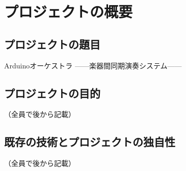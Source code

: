 \section{プロジェクトの概要}

\subsection{プロジェクトの題目}
Arduinoオーケストラ ——楽器間同期演奏システム——

\subsection{プロジェクトの目的}
（全員で後から記載）

\subsection{既存の技術とプロジェクトの独自性}
（全員で後から記載）

